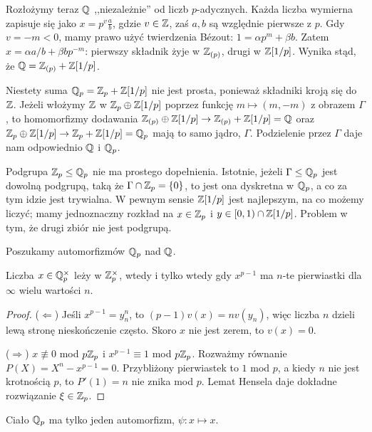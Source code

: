Rozłożymy teraz $\mathbb Q$ ,,niezależnie'' od liczb $p$-adycznych.
Każda liczba wymierna zapisuje się jako $x = p^v \frac a b$, gdzie $v \in \mathbb Z$, zaś $a, b$ są względnie pierwsze z $p$.
Gdy $v = -m < 0$, mamy prawo użyć twierdzenia Bézout: $1 = \alpha p^m + \beta b$.
Zatem $x = \alpha a / b + \beta b p^{-m}$: pierwszy składnik żyje w $\mathbb Z_{(p)}$, drugi w $\mathbb Z[1/p]$.
Wynika stąd, że $\mathbb Q = \mathbb Z_{(p)} + \mathbb Z[1/p]$.

Niestety  suma $\mathbb Q_p = \mathbb Z_p + \mathbb Z[1/p]$ nie jest prosta, ponieważ składniki kroją się do $\mathbb Z$.
Jeżeli włożymy $\mathbb Z$ w $\mathbb Z_p \oplus \mathbb Z[1/p]$ poprzez funkcję $m \mapsto (m, -m)$ z obrazem $\Gamma$, to homomorfizmy dodawania 
$\mathbb Z_{(p)} \oplus \mathbb Z[1/p] \to \mathbb Z_{(p)} + \mathbb Z[1/p] = \mathbb Q$ oraz $\mathbb Z_p \oplus \mathbb Z[1/p] \to \mathbb Z_p + \mathbb Z[1/p] = \mathbb Q_p$ mają to samo jądro, $\Gamma$.
Podzielenie przez $\Gamma$ daje nam odpowiednio $\mathbb Q$ i $\mathbb Q_p$.


Podgrupa $\mathbb Z_p \le \mathbb Q_p$ nie ma prostego dopełnienia.
Istotnie, jeżeli $\Gamma \le \mathbb Q_p$ jest dowolną podgrupą, taką że $\Gamma \cap \mathbb Z_p = \{0\}$, to jest ona dyskretna w $\mathbb Q_p$, a co za tym idzie jest trywialna.
W pewnym sensie $\mathbb Z[1/p]$ jest najlepszym, na co możemy liczyć; mamy jednoznaczny rozkład na $x \in \mathbb Z_p$ i $y \in [0,1) \cap \mathbb Z[1/p]$.
Problem w tym, że drugi zbiór nie jest podgrupą.

Poszukamy automorfizmów $\mathbb Q_p$ nad $\mathbb Q$.

\begin{lemat}
	Liczba $x \in \mathbb Q_p^\times$ leży w $\mathbb Z_p^\times$, wtedy i tylko wtedy gdy $x^{p-1}$ ma $n$-te pierwiastki dla $\infty$ wielu wartości $n$.
\end{lemat}

\begin{proof}
	($\Leftarrow$) Jeśli $x^{p-1} = y_n^n$, to $(p-1)v(x) = n v(y_n)$, więc liczba $n$ dzieli lewą stronę nieskończenie często.
	Skoro $x$ nie jest zerem, to $v(x) = 0$.

	($\Rightarrow$)
	$x \not \equiv 0$ mod $p\mathbb Z_p$ i $x^{p-1} \equiv 1$ mod $p \mathbb Z_p$.
	Rozważmy równanie $P(X) = X^n-x^{p-1} = 0$.
	Przybliżony pierwiastek to $1$ mod $p$, a kiedy $n$ nie jest krotnością $p$, to $P'(1) = n$ nie znika mod $p$.
	Lemat Hensela daje dokładne rozwiązanie $\xi \in \mathbb Z_p$.
\end{proof}

\begin{fakt}
	Ciało $\mathbb Q_p$ ma tylko jeden automorfizm, $\psi \colon x \mapsto x$.
\end{fakt}

